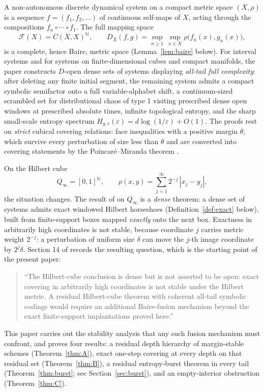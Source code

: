 \documentclass[11pt]{article}
\newcommand{\Q}{Q_\infty}
\newcommand{\F}{\mathcal{F}}
\begin{document}
A non-autonomous discrete dynamical system on a compact metric space $(X,\rho)$ is a
sequence $f=(f_1,f_2,\dots)$ of continuous self-maps of $X$, acting through the
compositions $f_n\circ\cdots\circ f_1$.  The full mapping space
\[
\F(X)=C(X,X)^{\mathbb N},
\qquad
D_X(f,g)=\sup_{n\ge 1}\,\sup_{x\in X}\rho\bigl(f_n(x),g_n(x)\bigr),
\]
is a complete, hence Baire, metric space (Lemma~\ref{lem:baire} below).  For interval
systems and for systems on finite-dimensional cubes and compact manifolds, the paper
\cite{Shmalo2026} constructs $D$-open dense sets of systems displaying \emph{all-tail
full complexity}: after deleting any finite initial segment, the remaining system
admits a compact symbolic semifactor onto a full variable-alphabet shift, a
continuum-sized scrambled set for distributional chaos of type 1 visiting prescribed
dense open windows at prescribed absolute times, infinite topological entropy, and the
sharp small-scale entropy spectrum $H_{g,r}(\varepsilon)=d\log(1/\varepsilon)+O(1)$.
The proofs rest on \emph{strict} cubical covering relations: face inequalities with a
positive margin $\theta$, which survive every perturbation of size less than $\theta$
and are converted into covering statements by the Poincar\'e--Miranda theorem
\cite{Miranda,Kulpa}.

On the Hilbert cube
\[
\Q=[0,1]^{\mathbb N},
\qquad
\rho(x,y)=\sum_{j=1}^\infty 2^{-j}\,|x_j-y_j|,
\]
the situation changes.  The result of \cite{Shmalo2026} on $\Q$ is a \emph{dense}
theorem: a dense set of systems admits exact windowed Hilbert horseshoes
(Definition~\ref{def:exact} below), built from finite-support boxes mapped
\emph{exactly} onto the next box.  Exactness in arbitrarily high coordinates is not
stable, because coordinate $j$ carries metric weight $2^{-j}$: a perturbation of
uniform size $\delta$ can move the $j$-th image coordinate by $2^{j}\delta$.  Section 14
of \cite{Shmalo2026} records the resulting question, which is the starting point of
the present paper:

\begin{quotation}
\noindent``The Hilbert-cube conclusion is dense but is not asserted to be open: exact
covering in arbitrarily high coordinates is not stable under the Hilbert metric.  A
residual Hilbert-cube theorem with coherent all-tail symbolic codings would require an
additional Baire-fusion mechanism beyond the exact finite-support implantations proved
here.''
\end{quotation}

This paper carries out the stability analysis that any such fusion mechanism must
confront, and proves four results: a residual depth hierarchy of margin-stable
schemes (Theorem~\ref{thm:A}), exact one-step covering at every depth on that
residual set (Theorem~\ref{thm:B}), a residual entropy-burst theorem in every tail
(Theorem~\ref{thm:burst}; see Section~\ref{sec:burst}), and an empty-interior
obstruction (Theorem~\ref{thm:C}).
\end{document}
